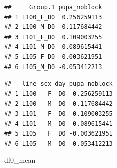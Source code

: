 \documentclass[
]{article}
\newenvironment{Shaded}{\begin{snugshade}}{\end{snugshade}}
\newcommand{\CommentTok}[1]{\textcolor[rgb]{0.56,0.35,0.01}{\textit{#1}}}
\newcommand{\DecValTok}[1]{\textcolor[rgb]{0.00,0.00,0.81}{#1}}
\newcommand{\FloatTok}[1]{\textcolor[rgb]{0.00,0.00,0.81}{#1}}
\newcommand{\KeywordTok}[1]{\textcolor[rgb]{0.13,0.29,0.53}{\textbf{#1}}}
\newcommand{\NormalTok}[1]{#1}
\newcommand{\OperatorTok}[1]{\textcolor[rgb]{0.81,0.36,0.00}{\textbf{#1}}}
\newcommand{\StringTok}[1]{\textcolor[rgb]{0.31,0.60,0.02}{#1}}
\begin{document}
\begin{Shaded}
\end{Shaded}

\begin{verbatim}
##     Group.1 pupa_noblock
## 1 L100_F_D0  0.256259113
## 2 L100_M_D0  0.117684442
## 3 L101_F_D0  0.109003255
## 4 L101_M_D0  0.089615441
## 5 L105_F_D0 -0.003621951
## 6 L105_M_D0 -0.053412213
\end{verbatim}

\begin{Shaded}
\end{Shaded}

\begin{verbatim}
##   line sex day pupa_noblock
## 1 L100   F  D0  0.256259113
## 2 L100   M  D0  0.117684442
## 3 L101   F  D0  0.109003255
## 4 L101   M  D0  0.089615441
## 5 L105   F  D0 -0.003621951
## 6 L105   M  D0 -0.053412213
\end{verbatim}

\begin{Shaded}
\begin{Highlighting}[]
\NormalTok{df0_mean}
\end{Highlighting}
\end{Shaded}
\end{document}
